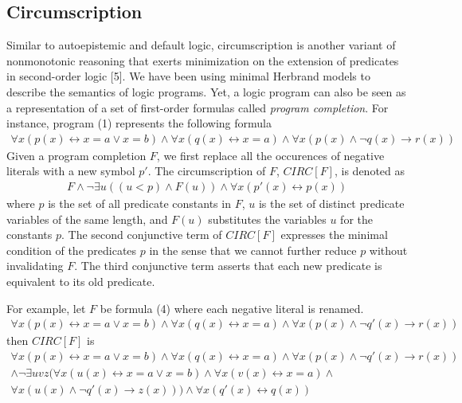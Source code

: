 \subsection{Circumscription}
Similar to autoepistemic and default logic, circumscription is another variant of 
nonmonotonic reasoning that exerts minimization on the extension of predicates in 
second-order logic [5]. We have been using minimal Herbrand models to describe the semantics 
of logic programs. Yet, a logic program can also be seen as a representation of a set of 
first-order formulas called \emph{program completion}. For instance, program (1) 
represents the following formula
\begin{align}
    \forall x (p(x) \leftrightarrow x = a \lor x = b) \land 
    \forall x (q(x) \leftrightarrow x = a) \land 
    \forall x (p(x) \land \neg q(x) \rightarrow r(x))
\end{align}
Given a program completion $F$, we first replace all the occurences of negative literals 
with a new symbol $p'$. The circumscription of $F$, $CIRC[F]$, is denoted as 
\begin{align}
    F \land \neg \exists u((u < p) \land F(u)) \land \forall x (p'(x) \leftrightarrow p(x))
\end{align}
where $p$ is the set of all predicate constants in $F$, $u$ is the set of distinct 
predicate variables of the same length, and $F(u)$ substitutes the variables $u$ for 
the constants $p$. The second conjunctive term of $CIRC[F]$ expresses the minimal 
condition of the predicates $p$ in the sense that we cannot further reduce $p$ without 
invalidating $F$. The third conjunctive term asserts that each new predicate is 
equivalent to its old predicate.

For example, let $F$ be formula (4) where each negative literal is renamed.
\begin{align*}
    \forall x (p(x) \leftrightarrow x = a \lor x = b) \land 
    \forall x (q(x) \leftrightarrow x = a) \land 
    \forall x (p(x) \land \neg q'(x) \rightarrow r(x))
\end{align*}
then $CIRC[F]$ is 
\begin{multline*}
    \forall x (p(x) \leftrightarrow x = a \lor x = b) \land 
    \forall x (q(x) \leftrightarrow x = a) \land 
    \forall x (p(x) \land \neg q'(x) \rightarrow r(x)) \\ 
    \land \neg \exists uvz (
        \forall x (u(x) \leftrightarrow x = a \lor x = b) \land 
        \forall x (v(x) \leftrightarrow x = a) \land 
        \\ \forall x (u(x) \land \neg q'(x) \rightarrow z(x)) 
    ) 
    \land \forall x (q'(x) \leftrightarrow q(x))
\end{multline*}

